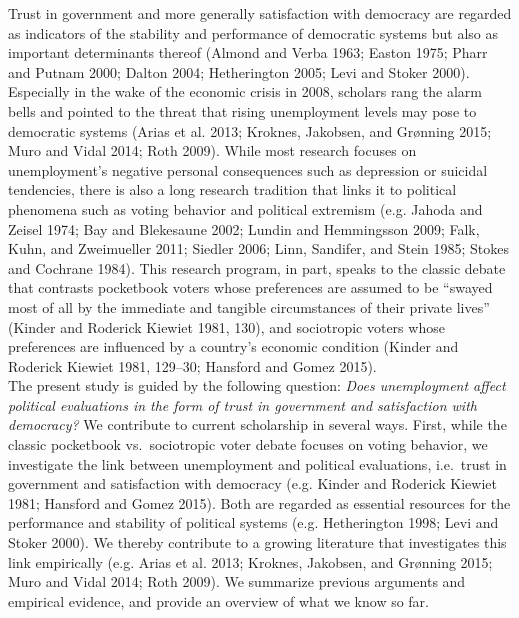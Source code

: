 \documentclass[12pt,]{article}
\begin{document}
Trust in government and more generally satisfaction with democracy are regarded as indicators of the stability and performance of democratic systems but also as important determinants thereof (Almond and Verba 1963; Easton 1975; Pharr and Putnam 2000; Dalton 2004; Hetherington 2005; Levi and Stoker 2000). Especially in the wake of the economic crisis in 2008, scholars rang the alarm bells and pointed to the threat that rising unemployment levels may pose to democratic systems (Arias et al. 2013; Kroknes, Jakobsen, and Grønning 2015; Muro and Vidal 2014; Roth 2009). While most research focuses on unemployment's negative personal consequences such as depression or suicidal tendencies, there is also a long research tradition that links it to political phenomena such as voting behavior and political extremism (e.g. Jahoda and Zeisel 1974; Bay and Blekesaune 2002; Lundin and Hemmingsson 2009; Falk, Kuhn, and Zweimueller 2011; Siedler 2006; Linn, Sandifer, and Stein 1985; Stokes and Cochrane 1984). This research program, in part, speaks to the classic debate that contrasts pocketbook voters whose preferences are assumed to be ``swayed most of all by the immediate and tangible circumstances of their private lives'' (Kinder and Roderick Kiewiet 1981, 130), and sociotropic voters whose preferences are influenced by a country's economic condition (Kinder and Roderick Kiewiet 1981, 129--30; Hansford and Gomez 2015).\\
The present study is guided by the following question: \emph{Does unemployment affect political evaluations in the form of trust in government and satisfaction with democracy?} We contribute to current scholarship in several ways. First, while the classic pocketbook vs.~sociotropic voter debate focuses on voting behavior, we investigate the link between unemployment and political evaluations, i.e.~trust in government and satisfaction with democracy (e.g. Kinder and Roderick Kiewiet 1981; Hansford and Gomez 2015). Both are regarded as essential resources for the performance and stability of political systems (e.g. Hetherington 1998; Levi and Stoker 2000). We thereby contribute to a growing literature that investigates this link empirically (e.g. Arias et al. 2013; Kroknes, Jakobsen, and Grønning 2015; Muro and Vidal 2014; Roth 2009). We summarize previous arguments and empirical evidence, and provide an overview of what we know so far.\\
\end{document}
